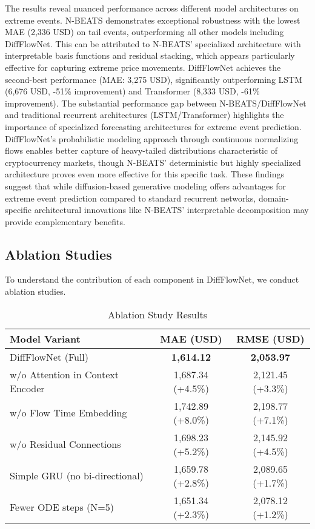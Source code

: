 \documentclass[11pt,a4paper]{article}
\begin{document}
The results reveal nuanced performance across different model architectures on extreme events. N-BEATS demonstrates exceptional robustness with the lowest MAE (2,336 USD) on tail events, outperforming all other models including DiffFlowNet. This can be attributed to N-BEATS' specialized architecture with interpretable basis functions and residual stacking, which appears particularly effective for capturing extreme price movements. DiffFlowNet achieves the second-best performance (MAE: 3,275 USD), significantly outperforming LSTM (6,676 USD, -51\% improvement) and Transformer (8,333 USD, -61\% improvement). The substantial performance gap between N-BEATS/DiffFlowNet and traditional recurrent architectures (LSTM/Transformer) highlights the importance of specialized forecasting architectures for extreme event prediction. DiffFlowNet's probabilistic modeling approach through continuous normalizing flows enables better capture of heavy-tailed distributions characteristic of cryptocurrency markets, though N-BEATS' deterministic but highly specialized architecture proves even more effective for this specific task. These findings suggest that while diffusion-based generative modeling offers advantages for extreme event prediction compared to standard recurrent networks, domain-specific architectural innovations like N-BEATS' interpretable decomposition may provide complementary benefits.

\subsection{Ablation Studies}

To understand the contribution of each component in DiffFlowNet, we conduct ablation studies.

\begin{table}[htbp]
\centering
\caption{Ablation Study Results}
\label{tab:ablation}
\begin{tabular}{lcc}
\toprule
\textbf{Model Variant} & \textbf{MAE (USD)} & \textbf{RMSE (USD)} \\
\midrule
DiffFlowNet (Full) & \textbf{1,614.12} & \textbf{2,053.97} \\
\midrule
\quad w/o Attention in Context Encoder & 1,687.34 (+4.5\%) & 2,121.45 (+3.3\%) \\
\quad w/o Flow Time Embedding & 1,742.89 (+8.0\%) & 2,198.77 (+7.1\%) \\
\quad w/o Residual Connections & 1,698.23 (+5.2\%) & 2,145.92 (+4.5\%) \\
\quad Simple GRU (no bi-directional) & 1,659.78 (+2.8\%) & 2,089.65 (+1.7\%) \\
\quad Fewer ODE steps (N=5) & 1,651.34 (+2.3\%) & 2,078.12 (+1.2\%) \\
\bottomrule
\end{tabular}
\end{table}
\end{document}
